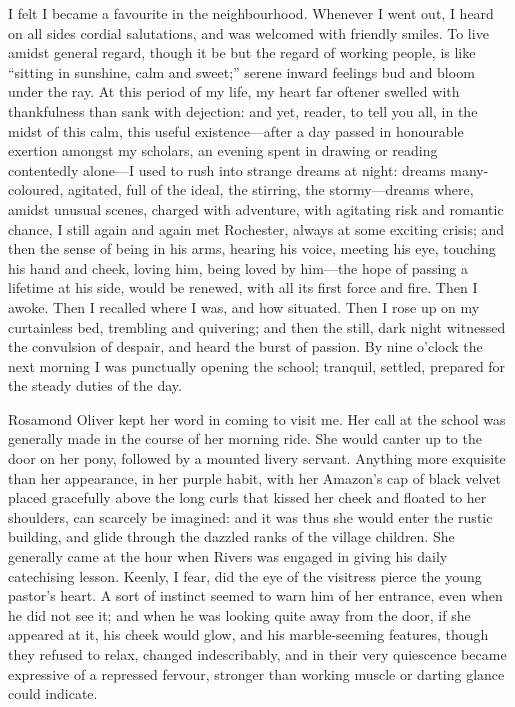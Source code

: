 I felt I became a favourite in the neighbourhood. Whenever I went out,
I heard on all sides cordial salutations, and was welcomed with friendly
smiles. To live amidst general regard, though it be but the regard of
working people, is like \enquote{sitting in sunshine, calm and sweet;}
serene inward feelings bud and bloom under the ray. At this period of
my life, my heart far oftener swelled with thankfulness than sank with
dejection: and yet, reader, to tell you all, in the midst of this calm,
this useful existence---after a day passed in honourable exertion
amongst my scholars, an evening spent in drawing or reading contentedly
alone---I used to rush into strange dreams at night: dreams
many-coloured, agitated, full of the ideal, the stirring, the
stormy---dreams where, amidst unusual scenes, charged with adventure,
with agitating risk and romantic chance, I still again and again met \Mr{}
 Rochester, always at some exciting crisis; and then the sense of being
in his arms, hearing his voice, meeting his eye, touching his hand and
cheek, loving him, being loved by him---the hope of passing a lifetime
at his side, would be renewed, with all its first force and fire. Then
I awoke. Then I recalled where I was, and how situated. Then I rose up
on my curtainless bed, trembling and quivering; and then the still, dark
night witnessed the convulsion of despair, and heard the burst of
passion. By nine o'clock the next morning I was punctually opening the
school; tranquil, settled, prepared for the steady duties of the day.

Rosamond Oliver kept her word in coming to visit me. Her call at the
school was generally made in the course of her morning ride. She would
canter up to the door on her pony, followed by a mounted livery
servant. Anything more exquisite than her appearance, in her purple
habit, with her Amazon's cap of black velvet placed gracefully above the
long curls that kissed her cheek and floated to her shoulders, can
scarcely be imagined: and it was thus she would enter the rustic
building, and glide through the dazzled ranks of the village children. 
She generally came at the hour when \Mr{} Rivers was engaged in giving his
daily catechising lesson. Keenly, I fear, did the eye of the visitress
pierce the young pastor's heart. A sort of instinct seemed to warn him
of her entrance, even when he did not see it; and when he was looking
quite away from the door, if she appeared at it, his cheek would glow,
and his marble-seeming features, though they refused to relax, changed
indescribably, and in their very quiescence became expressive of a
repressed fervour, stronger than working muscle or darting glance could
indicate.

